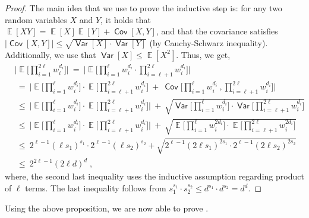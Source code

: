 \documentclass[11pt]{article}
\DeclareMathOperator*{\Ex}{\mathbb{E}}
\DeclareMathOperator*{\Var}{\mathsf{Var}}
\DeclareMathOperator*{\Cov}{\mathsf{Cov}}
\begin{document}
\begin{proof}
	The main idea that we use to prove the inductive step is: for any two random variables $X$ and $Y$, it holds that $\Ex[XY] = \Ex[X] \Ex[Y] + \Cov[X,Y]$, and that the covariance satisfies $|\Cov[X,Y]| \le \sqrt{\Var[X] \cdot \Var[Y]}$ (by Cauchy-Schwarz inequality). Additionally, we use that $\Var[X] \le \Ex[X^2]$. Thus, we get,
	\begin{align*}
	&\bigg|  \Ex \bigg[ \prod_{i=1}^{2\ell} w_i^{d_i} \bigg] \bigg|%
	~=~ \bigg|  \Ex \bigg[ \prod_{i=1}^{\ell} w_i^{d_i} \cdot \prod_{i=\ell+1}^{2\ell} w_i^{d_i} \bigg] \bigg|\\
	&~=~ \bigg|  \Ex\bigg[ \prod_{i=1}^{\ell} w_i^{d_i} \bigg] \cdot \Ex \bigg[ \prod_{i=\ell+1}^{2\ell} w_i^{d_i} \bigg] ~+~ \Cov\bigg[ \prod_{i=1}^{\ell} w_i^{d_i}\ , \prod_{i=\ell+1}^{2\ell} w_i^{d_i}\bigg]  \bigg| \\ 
	&~\le~ \bigg|  \Ex\bigg[ \prod_{i=1}^{\ell} w_i^{d_i} \bigg] \cdot \Ex \bigg[ \prod_{i=\ell+1}^{2\ell} w_i^{d_i} \bigg] \bigg|  ~+~ \sqrt{\Var\bigg[ \prod_{i=1}^{\ell} w_i^{d_i} \bigg] \cdot \Var\bigg[ \prod_{i=\ell+1}^{2\ell} w_i^{d_i}\bigg]}\\
	&~\le~ \bigg|  \Ex\bigg[ \prod_{i=1}^{\ell} w_i^{d_i} \bigg] \cdot \Ex \bigg[ \prod_{i=\ell+1}^{2\ell} w_i^{d_i} \bigg] \bigg| ~+~ \sqrt{\Ex\bigg[ \prod_{i=1}^{\ell} w_i^{2d_i} \bigg] \cdot \Ex\bigg[ \prod_{i=\ell+1}^{2\ell} w_i^{2d_i}\bigg]}\\
	&~\le~ 2^{\ell-1} (\ell s_1)^{s_1} \cdot 2^{\ell-1} (\ell s_2)^{s_2} + \sqrt{2^{\ell - 1} (2\ell s_1)^{2s_1} \cdot 2^{\ell-1} (2\ell s_2)^{2s_2}}\\
	&~\le~ 2^{2\ell-1} (2\ell d)^{d}\;,
	\end{align*}
	where, the second last inequality uses the inductive assumption regarding product of $\ell$ terms. The last inequality follows from $s_1^{s_1} \cdot s_2^{s_2} \le d^{s_1} \cdot d^{s_2} = d^d$.
\end{proof}
\noindent Using the above proposition, we are now able to prove .
\end{document}
